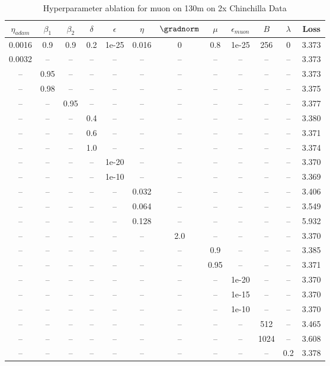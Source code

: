 \begin{table}[h!]
\centering
\caption{Hyperparameter ablation for muon on 130m on 2x Chinchilla Data}
\label{tab:ablation_muon_130m_on_2x_chinchilla_data}
\begin{tabular}{cccccccccccc}
\toprule
$\eta_{adam}$ & $\beta_1$ & $\beta_2$ & $\delta$ & $\epsilon$ & $\eta$ & $\gradnorm$ & $\mu$ & $\epsilon_{muon}$ & $B$ & $\lambda$ & Loss \\
\midrule
0.0016 & 0.9 & 0.9 & 0.2 & 1e-25 & 0.016 & 0 & 0.8 & 1e-25 & 256 & 0 & 3.373 \\
\midrule
0.0032 & -- & -- & -- & -- & -- & -- & -- & -- & -- & -- & 3.373 \\
-- & 0.95 & -- & -- & -- & -- & -- & -- & -- & -- & -- & 3.373 \\
-- & 0.98 & -- & -- & -- & -- & -- & -- & -- & -- & -- & 3.375 \\
-- & -- & 0.95 & -- & -- & -- & -- & -- & -- & -- & -- & 3.377 \\
-- & -- & -- & 0.4 & -- & -- & -- & -- & -- & -- & -- & 3.380 \\
-- & -- & -- & 0.6 & -- & -- & -- & -- & -- & -- & -- & 3.371 \\
-- & -- & -- & 1.0 & -- & -- & -- & -- & -- & -- & -- & 3.374 \\
-- & -- & -- & -- & 1e-20 & -- & -- & -- & -- & -- & -- & 3.370 \\
-- & -- & -- & -- & 1e-10 & -- & -- & -- & -- & -- & -- & 3.369 \\
-- & -- & -- & -- & -- & 0.032 & -- & -- & -- & -- & -- & 3.406 \\
-- & -- & -- & -- & -- & 0.064 & -- & -- & -- & -- & -- & 3.549 \\
-- & -- & -- & -- & -- & 0.128 & -- & -- & -- & -- & -- & 5.932 \\
-- & -- & -- & -- & -- & -- & 2.0 & -- & -- & -- & -- & 3.370 \\
-- & -- & -- & -- & -- & -- & -- & 0.9 & -- & -- & -- & 3.385 \\
-- & -- & -- & -- & -- & -- & -- & 0.95 & -- & -- & -- & 3.371 \\
-- & -- & -- & -- & -- & -- & -- & -- & 1e-20 & -- & -- & 3.370 \\
-- & -- & -- & -- & -- & -- & -- & -- & 1e-15 & -- & -- & 3.370 \\
-- & -- & -- & -- & -- & -- & -- & -- & 1e-10 & -- & -- & 3.370 \\
-- & -- & -- & -- & -- & -- & -- & -- & -- & 512 & -- & 3.465 \\
-- & -- & -- & -- & -- & -- & -- & -- & -- & 1024 & -- & 3.608 \\
-- & -- & -- & -- & -- & -- & -- & -- & -- & -- & 0.2 & 3.378 \\
\bottomrule
\end{tabular}
\end{table}

